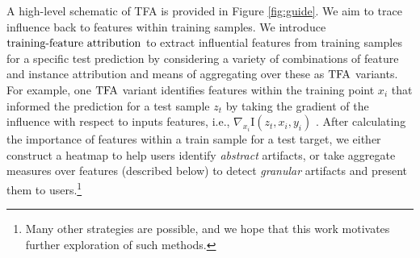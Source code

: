 \documentclass[11pt]{article}
\begin{document}
A high-level schematic of TFA is provided in Figure \ref{fig:guide}.
We aim to trace influence back to features within training samples. %
We introduce $\text{training-feature attribution}$ %
to extract influential features from training samples for a specific test prediction by considering a variety of combinations of feature and instance attribution and means of aggregating over these as $\text{TFA}$ variants. 
For example, one $\text{TFA}$ variant %
identifies features within the training point $x_i$ that informed the prediction for a test sample $z_t$ by %
taking the gradient of the influence with respect to inputs features, i.e., $\nabla_{x_i} \text{I}(z_t, x_i, y_i)$ \cite{koh2017understanding}.
After calculating the importance of features within a train sample for a test target, we either construct a heatmap to help users identify \textit{abstract} artifacts, or %
take aggregate measures over features (described below) to detect \textit{granular} artifacts 
and present them to users.\footnote{Many other strategies are possible, and we hope that this work motivates further exploration of such methods.} 


\end{document}

